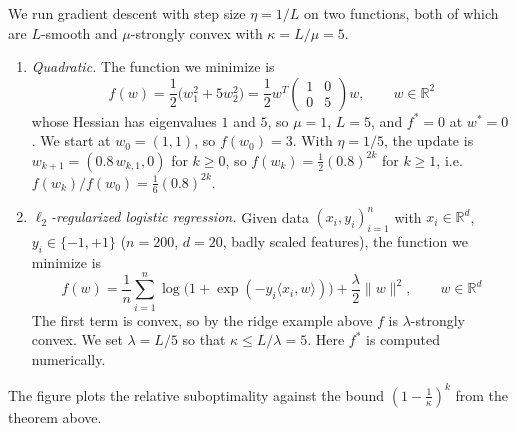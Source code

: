 	\begin{example}
		We run gradient descent with step size $\eta = 1/L$ on two functions, both of which are $L$-smooth and $\mu$-strongly convex with $\kappa = L/\mu = 5$. 
		\begin{enumerate}
			\item \textit{Quadratic.} The function we minimize is 
			\begin{equation}
			  f(w) = \frac{1}{2} \big( w_1^2 + 5 w_2^2 \big) = \frac{1}{2} w^T \begin{pmatrix} 1 & 0 \\ 0 & 5 \end{pmatrix} w, \qquad w \in \mathbb{R}^2
			\end{equation}
			 whose Hessian has eigenvalues $1$ and $5$, so $\mu = 1$, $L = 5$, and $f^\ast = 0$ at $w^\ast = 0$. We start at $w_0 = (1, 1)$, so $f(w_0) = 3$. With $\eta = 1/5$, the update is $w_{k+1} = (0.8\, w_{k, 1}, 0)$ for $k \geq 0$, so $f(w_k) = \frac{1}{2} (0.8)^{2k}$ for $k \geq 1$, i.e. $f(w_k)/f(w_0) = \frac{1}{6} (0.8)^{2k}$. 
			\item \textit{$\ell_2$-regularized logistic regression.} Given data $(x_i, y_i)_{i=1}^n$ with $x_i \in \mathbb{R}^d$, $y_i \in \{-1, +1\}$ ($n = 200$, $d = 20$, badly scaled features), the function we minimize is 
			\begin{equation}
			  f(w) = \frac{1}{n} \sum_{i=1}^n \log \Big( 1 + \exp(-y_i \langle x_i, w \rangle) \Big) + \frac{\lambda}{2} \|w\|^2, \qquad w \in \mathbb{R}^{d}
			\end{equation}
			 The first term is convex, so by the ridge example above $f$ is $\lambda$-strongly convex. We set $\lambda = L/5$ so that $\kappa \leq L/\lambda = 5$. Here $f^\ast$ is computed numerically. 
		\end{enumerate}
		The figure plots the relative suboptimality against the bound $(1 - \frac{1}{\kappa})^k$ from the theorem above. 
		\begin{figure}[H]
			\centering
\end{figure}
\end{example}
